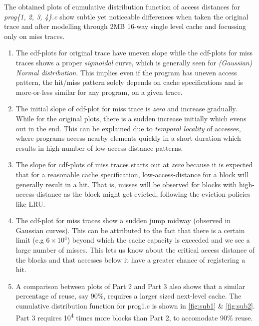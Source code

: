 
The obtained plots of cumulative distribution function of access distances for \textit{prog\{1, 2, 3, 4\}.c} show subtle yet noticeable differences when taken the original trace and after modelling through 2MB 16-way single level cache and focussing only on miss traces.

\begin{enumerate}
	\item The cdf-plots for original trace have uneven slope while the cdf-plots for miss traces shows a 
	proper \textit{sigmoidal} curve, which is generally seen for \textit{(Gaussian)}\textit{ Normal distribution}. 
	This implies even if the program has uneven access pattern, the hit/miss pattern solely depends on cache 
	specifications and is more-or-less similar for any program, on a given trace.
	
	\item The initial slope of cdf-plot for miss trace is \textit{zero} and increase gradually. While for the
	original plots, there is a sudden increase initially which evens out in the end. This can be explained
	due to \textit{temporal locality} of accesses, where programs access nearby elements quickly in a short
	duration which results in high number of low-access-distance patterns.
	
	\item The slope for cdf-plots of miss traces starts out at \textit{zero} because it is expected that for
	a reasonable cache specification, low-access-distance for a block will generally result in a hit. That is,
	misses will be observed for blocks with high-access-distance as the block might get evicted, following
	the eviction policies like LRU.
	
	\item The cdf-plot for miss traces show a sudden jump midway (observed in Gaussian curves). This can be
	attributed to the fact that there is a certain limit (e.g $6 \times 10^{4}$) beyond which the cache 
	capacity is exceeded and we see a large number of misses. This lets us know about the critical access
	distance of the blocks and that accesses below it have a greater chance of registering a hit.

	\item A comparison between plots of Part 2 and Part 3 also shows that a similar percentage of reuse, say 90\%, 
	requires a larger sized next-level cache. The cumulative distribution function for prog1.c is shown in 
	\ref{fig:sub1} \& \ref{fig:sub2}. Part 3 requires 10\textsuperscript{4} times more
	blocks than Part 2, to accomodate 90\% reuse. 
\end{enumerate}